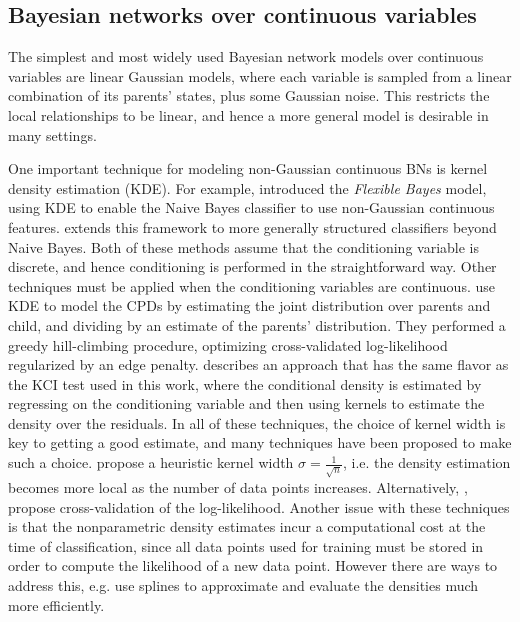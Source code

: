 \documentclass{article} %
\begin{document}
\subsection{Bayesian networks over continuous variables}
The simplest and most widely used Bayesian network models over continuous variables are linear Gaussian models, where each variable is sampled from a linear combination of its parents' states, plus some Gaussian noise.  This restricts the local relationships to be linear, and hence a more general model is desirable in many settings.

One important technique for modeling non-Gaussian continuous BNs is kernel density estimation (KDE).  For example, \cite{john1995estimating} introduced the {\it Flexible Bayes} model, using KDE to enable the Naive Bayes classifier to use non-Gaussian continuous features.  \cite{perez2009bayesian} extends this framework to more generally structured classifiers beyond Naive Bayes.  Both of these methods assume that the conditioning variable is discrete, and hence conditioning is performed in the straightforward way.  Other techniques must be applied when the conditioning variables are continuous.  \cite{hofmann1996discovering} use KDE to model the CPDs by estimating the joint distribution over parents and child, and dividing by an estimate of the parents' distribution.  They performed a greedy hill-climbing procedure, optimizing cross-validated log-likelihood regularized by an edge penalty.  \cite{hansen2004nonparametric} describes an approach that has the same flavor as the KCI test used in this work, where the conditional density is estimated by regressing on the conditioning variable and then using kernels to estimate the density over the residuals.  In all of these techniques, the choice of kernel width is key to getting a good estimate, and many techniques have been proposed to make such a choice.  \cite{john1995estimating} propose a heuristic kernel width $\sigma = \frac{1}{\sqrt n}$, i.e. the density estimation becomes more local as the number of data points increases.  Alternatively, \cite{holmes2012fast}, propose cross-validation of the log-likelihood.  Another issue with these techniques is that the nonparametric density estimates incur a computational cost at the time of classification, since all data points used for training must be stored in order to compute the likelihood of a new data point.  However there are ways to address this, e.g. \cite{gurwicz2004rapid} use splines to approximate and evaluate the densities much more efficiently.  
\end{document}
